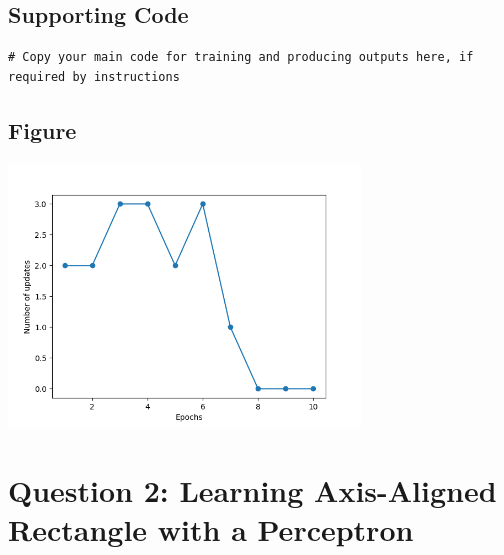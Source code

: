 \documentclass[11pt]{article}
\begin{document}
\subsection{Supporting Code}
\begin{verbatim}
# Copy your main code for training and producing outputs here, if required by instructions
\end{verbatim}

\subsection{Figure}
\begin{center}
  \includegraphics[width=0.7\textwidth]{png/Figure_1.png}
\end{center}

\newpage

\section{Question 2: Learning Axis-Aligned Rectangle with a Perceptron}
\end{document}
